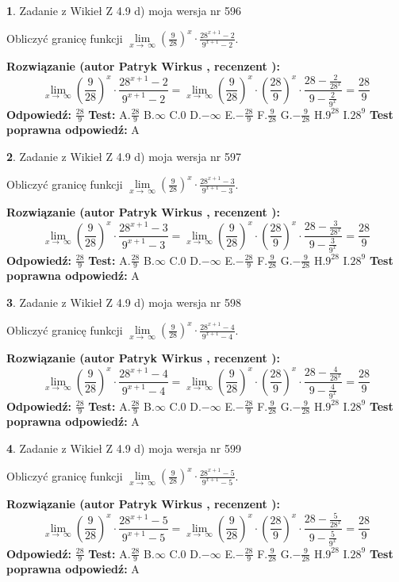 \documentclass[12pt, a4paper]{article}
\theoremstyle{definition} %
\newtheorem{zad}{}
\newcommand{\zadStart}[1]{\begin{zad}#1\newline}
\newcommand{\zadStop}{\end{zad}}
\newcommand{\rozwStart}[2]{\noindent \textbf{Rozwiązanie (autor #1 , recenzent #2): }\newline}
\newcommand{\rozwStop}{\newline}
\newcommand{\odpStart}{\noindent \textbf{Odpowiedź:}\newline}
\newcommand{\odpStop}{\newline}
\newcommand{\testStart}{\noindent \textbf{Test:}\newline}
\newcommand{\testStop}{\newline}
\newcommand{\kluczStart}{\noindent \textbf{Test poprawna odpowiedź:}\newline}
\newcommand{\kluczStop}{\newline}
\begin{document}
\zadStart{Zadanie z Wikieł Z 4.9 d) moja wersja nr 596}


Obliczyć granicę funkcji  $\lim\limits_{x\to\ \infty}(\frac{9}{28})^{x}\cdot\frac{28^{x+1}-2}{9^{x+1}-2}$.
\zadStop
\rozwStart{Patryk Wirkus}{}
$$\lim\limits_{x\to\ \infty}(\frac{9}{28})^{x}\cdot\frac{28^{x+1}-2}{9^{x+1}-2}=\lim\limits_{x\to\ \infty}(\frac{9}{28})^{x}\cdot(\frac{28}{9})^{x} \cdot \frac{28-\frac{2}{28^{x}}}{9-\frac{2}{9^{x}}} = \frac{28}{9}$$
\rozwStop
\odpStart
$\frac{28}{9}$
\odpStop
\testStart
A.$\frac{28}{9}$ B.$\infty$ C.$0$ D.$-\infty$ E.$-\frac{28}{9}$
F.$\frac{9}{28}$ G.$-\frac{9}{28}$
H.$9^{28}$
I.$28^{9}$
\testStop
\kluczStart
A
\kluczStop



\zadStart{Zadanie z Wikieł Z 4.9 d) moja wersja nr 597}


Obliczyć granicę funkcji  $\lim\limits_{x\to\ \infty}(\frac{9}{28})^{x}\cdot\frac{28^{x+1}-3}{9^{x+1}-3}$.
\zadStop
\rozwStart{Patryk Wirkus}{}
$$\lim\limits_{x\to\ \infty}(\frac{9}{28})^{x}\cdot\frac{28^{x+1}-3}{9^{x+1}-3}=\lim\limits_{x\to\ \infty}(\frac{9}{28})^{x}\cdot(\frac{28}{9})^{x} \cdot \frac{28-\frac{3}{28^{x}}}{9-\frac{3}{9^{x}}} = \frac{28}{9}$$
\rozwStop
\odpStart
$\frac{28}{9}$
\odpStop
\testStart
A.$\frac{28}{9}$ B.$\infty$ C.$0$ D.$-\infty$ E.$-\frac{28}{9}$
F.$\frac{9}{28}$ G.$-\frac{9}{28}$
H.$9^{28}$
I.$28^{9}$
\testStop
\kluczStart
A
\kluczStop



\zadStart{Zadanie z Wikieł Z 4.9 d) moja wersja nr 598}


Obliczyć granicę funkcji  $\lim\limits_{x\to\ \infty}(\frac{9}{28})^{x}\cdot\frac{28^{x+1}-4}{9^{x+1}-4}$.
\zadStop
\rozwStart{Patryk Wirkus}{}
$$\lim\limits_{x\to\ \infty}(\frac{9}{28})^{x}\cdot\frac{28^{x+1}-4}{9^{x+1}-4}=\lim\limits_{x\to\ \infty}(\frac{9}{28})^{x}\cdot(\frac{28}{9})^{x} \cdot \frac{28-\frac{4}{28^{x}}}{9-\frac{4}{9^{x}}} = \frac{28}{9}$$
\rozwStop
\odpStart
$\frac{28}{9}$
\odpStop
\testStart
A.$\frac{28}{9}$ B.$\infty$ C.$0$ D.$-\infty$ E.$-\frac{28}{9}$
F.$\frac{9}{28}$ G.$-\frac{9}{28}$
H.$9^{28}$
I.$28^{9}$
\testStop
\kluczStart
A
\kluczStop



\zadStart{Zadanie z Wikieł Z 4.9 d) moja wersja nr 599}


Obliczyć granicę funkcji  $\lim\limits_{x\to\ \infty}(\frac{9}{28})^{x}\cdot\frac{28^{x+1}-5}{9^{x+1}-5}$.
\zadStop
\rozwStart{Patryk Wirkus}{}
$$\lim\limits_{x\to\ \infty}(\frac{9}{28})^{x}\cdot\frac{28^{x+1}-5}{9^{x+1}-5}=\lim\limits_{x\to\ \infty}(\frac{9}{28})^{x}\cdot(\frac{28}{9})^{x} \cdot \frac{28-\frac{5}{28^{x}}}{9-\frac{5}{9^{x}}} = \frac{28}{9}$$
\rozwStop
\odpStart
$\frac{28}{9}$
\odpStop
\testStart
A.$\frac{28}{9}$ B.$\infty$ C.$0$ D.$-\infty$ E.$-\frac{28}{9}$
F.$\frac{9}{28}$ G.$-\frac{9}{28}$
H.$9^{28}$
I.$28^{9}$
\testStop
\kluczStart
A
\kluczStop
\end{document}
